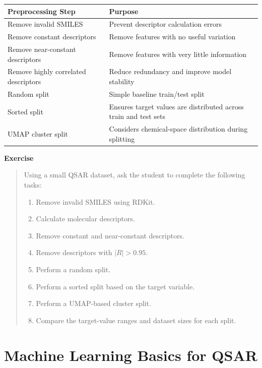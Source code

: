 \documentclass[11pt]{report}
\newenvironment{Important note}{\begin{quote}\color{red}\textbf{Important note:} }{\end{quote}}
\newenvironment{exercise}
{\vspace{0.5em}\noindent\textbf{Exercise}\begin{quote}}
{\end{quote}\vspace{0.5em}}
\begin{document}
\begin{center}
\begin{tabular}{p{}p{}}
\toprule
\textbf{Preprocessing Step} & \textbf{Purpose} \\
\midrule
Remove invalid SMILES & Prevent descriptor calculation errors \\
Remove constant descriptors & Remove features with no useful variation \\
Remove near-constant descriptors & Remove features with very little information \\
Remove highly correlated descriptors & Reduce redundancy and improve model stability \\
Random split & Simple baseline train/test split \\
Sorted split & Ensures target values are distributed across train and test sets \\
UMAP cluster split & Considers chemical-space distribution during splitting \\
\bottomrule
\end{tabular}
\end{center}

\begin{exercise}
Using a small QSAR dataset, ask the student to complete the following tasks:

\begin{enumerate}[leftmargin=*]
    \item Remove invalid SMILES using RDKit.
    \item Calculate molecular descriptors.
    \item Remove constant and near-constant descriptors.
    \item Remove descriptors with $|R| > 0.95$.
    \item Perform a random split.
    \item Perform a sorted split based on the target variable.
    \item Perform a UMAP-based cluster split.
    \item Compare the target-value ranges and dataset sizes for each split.
\end{enumerate}
\end{exercise}

\chapter{Machine Learning Basics for QSAR}
\end{document}
